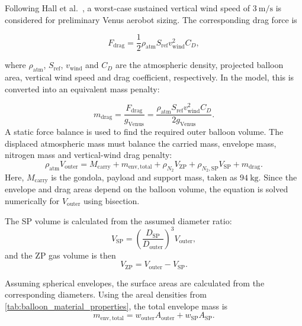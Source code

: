 Following Hall et al.~\cite{Hall2021}, a worst-case sustained vertical wind speed of 
$3~\mathrm{m/s}$ is considered for preliminary Venus aerobot sizing. The corresponding drag force is

\begin{equation}
    F_{\mathrm{drag}}
    =
    \frac{1}{2}
    \rho_{\mathrm{atm}}
    S_{\mathrm{ref}}
    v_{\mathrm{wind}}^2
    C_D ,
\end{equation}

where $\rho_{\mathrm{atm}}$, $S_{\mathrm{ref}}$, $v_{\mathrm{wind}}$ and $C_D$ are the atmospheric density, projected balloon area, vertical wind speed and drag coefficient, respectively. In the model, this is converted into an equivalent mass penalty:

\begin{equation}
    m_{\mathrm{drag}}
    =
    \frac{F_{\mathrm{drag}}}{g_{\mathrm{Venus}}}
    =
    \frac{
    \rho_{\mathrm{atm}}S_{\mathrm{ref}}v_{\mathrm{wind}}^2C_D
    }
    {2g_{\mathrm{Venus}}}.
\end{equation}
A static force balance is used to find the required outer balloon volume. The displaced atmospheric mass must balance the carried mass, envelope mass, nitrogen mass and vertical-wind drag penalty:
\begin{equation}
    \rho_{\mathrm{atm}}V_{\mathrm{outer}}
    =
    M_{\mathrm{carry}}
    +
    m_{\mathrm{env,total}}
    +
    \rho_{N_2}V_{\mathrm{ZP}}
    +
    \rho_{N_2,\mathrm{SP}}V_{\mathrm{SP}}
    +
    m_{\mathrm{drag}} .
\end{equation}
Here, $M_{\mathrm{carry}}$ is the gondola, payload and support mass, taken as $94~\mathrm{kg}$. Since the envelope and drag areas depend on the balloon volume, the equation is solved numerically for $V_{\mathrm{outer}}$ using bisection.

The SP volume is calculated from the assumed diameter ratio:
\begin{equation}
    V_{\mathrm{SP}}
    =
    \left(\frac{D_{\mathrm{SP}}}{D_{\mathrm{outer}}}\right)^3
    V_{\mathrm{outer}},
\end{equation}
and the ZP gas volume is then
\begin{equation}
    V_{\mathrm{ZP}}
    =
    V_{\mathrm{outer}} - V_{\mathrm{SP}} .
\end{equation}

Assuming spherical envelopes, the surface areas are calculated from the corresponding diameters. Using the areal densities from \autoref{tab:balloon_material_properties}, the total envelope mass is
\begin{equation}
    m_{\mathrm{env,total}}
    =
    w_{\mathrm{outer}}A_{\mathrm{outer}}
    +
    w_{\mathrm{SP}}A_{\mathrm{SP}} .
\end{equation}

